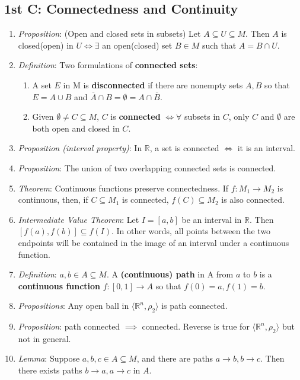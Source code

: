 \documentclass[10pt]{article}
\newcommand{\real}{\mathbb{R}}
\begin{document}
\begin{multicols*}{3}
	\section{1st C: Connectedness and Continuity}
	\begin{enumerate}
		\item \emph{Proposition}: (Open and closed sets in subsets) Let
		$A\subseteq U\subseteq M$. Then $A$ is closed(open) in $U\iff\exists$ an
		open(closed) set $B\in M$ such that $A = B\cap U$.
		\item \emph{Definition}: Two formulations of \textbf{connected sets}:
			\begin{enumerate}
				\item A set \(E\) in M is \textbf{disconnected} if there are nonempty
					sets \(A,B\) so that \(E=A\cup B\) and
					\(\overline{A}\cap B=\emptyset=A\cap\overline{B}\).
				\item Given $\emptyset\neq C\subseteq M$, $C$ is \textbf{connected}
					$\iff\forall$ subsets in $C$, only $C$ and $\emptyset$ are both open
					and closed in $C$.
			\end{enumerate}
		\item \emph{Proposition (interval property)}: In \(\mathbb{R}\), a set is
			connected \(\iff\) it is an interval.
		\item \emph{Proposition}: The union of two overlapping connected sets is
			connected.
			\item \emph{Theorem}: Continuous functions preserve connectedness.
			If $f:M_{1}\to M_{2}$ is continuous, then, if $C\subseteq M_{1}$ is
			connected, $f(C)\subseteq M_{2}$ is also connected.
		\item \emph{Intermediate Value Theorem}: Let $I=[a,b]$ be an interval in
			$\real$. Then $[f(a),f(b)]\subseteq f(I)$. In other words, all points
			between the two endpoints will be contained in the image of an interval
			under a continuous function.
			\item \emph{Definition}: $a,b\in A\subseteq M$. A \textbf{(continuous)
				path} in A from $a$ to $b$ is a \textbf{continuous function}
			$f:[0,1]\to A$ so that $f(0)=a, f(1)=b$.
			\item \emph{Propositions}: Any open ball in
			$\langle\real^{n},\rho_{2}\rangle$ is path connected.
			\item \emph{Proposition}: path connected $\implies$ connected. Reverse is
			true for $\langle\real^{n},\rho_{2}\rangle$ but not in general.
			\item \emph{Lemma}: Suppose $a,b,c\in A\subseteq M$, and there are paths
			$a\to b, b\to c$. Then there exists paths $b\to a, a\to c$ in $A$.
	\end{enumerate}


\end{multicols*}
\end{document}
